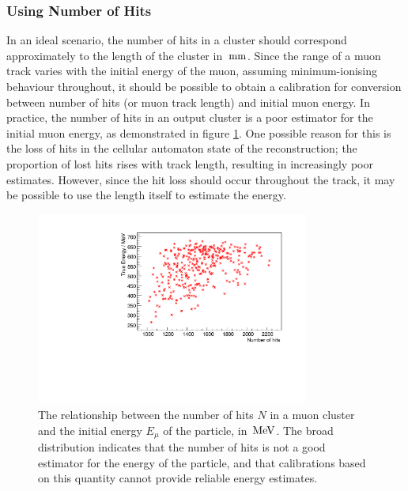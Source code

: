 \subsubsection{Using Number of Hits}
In an ideal scenario, the number of hits in a cluster should correspond approximately to the length of the cluster in $\,\mathrm{mm}$. Since the range of a muon track varies with the initial energy of the muon, assuming minimum-ionising behaviour throughout, it should be possible to obtain a calibration for conversion between number of hits (or muon track length) and initial muon energy. In practice, the number of hits in an output cluster is a poor estimator for the initial muon energy, as demonstrated in figure \ref{fig:ccqe-770-e-nhits-calib}. One possible reason for this is the loss of hits in the cellular automaton state of the reconstruction; the proportion of lost hits rises with track length, resulting in increasingly poor estimates. However, since the hit loss should occur throughout the track, it may be possible to use the length itself to estimate the energy.

\begin{figure}
    \centering
    \includegraphics[angle=-90,width=0.8\textwidth]{chapters/analysis_images/ccqe-770-e-nhits-calib}
    \caption[Relationship between number of hits and energy]{\label{fig:ccqe-770-e-nhits-calib}The relationship between the number of hits $N$ in a muon cluster and the initial energy $E_\mu$ of the particle, in $\,\mathrm{MeV}$. The broad distribution indicates that the number of hits is not a good estimator for the energy of the particle, and that calibrations based on this quantity cannot provide reliable energy estimates.}
\end{figure}

